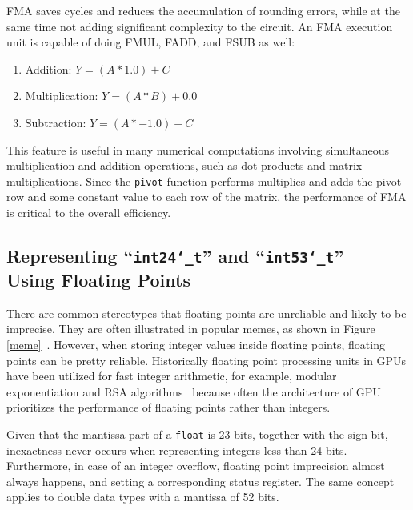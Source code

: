 \documentclass[logo,bsc,singlespacing,parskip]{infthesis}
\newcommand{\dtfloat}{\texttt{float}}
\newcommand{\dtfloati}{\texttt{int24\char`_t}}
\newcommand{\dtdoublei}{\texttt{int53\char`_t}}
\newcommand{\pivot}{\texttt{pivot}}
\newenvironment{compactlist}
{ \begin{enumerate}
    \setlength{\itemsep}{0pt}
    \setlength{\parskip}{0pt}
    \setlength{\parsep}{0pt}     
}
{ \end{enumerate} }
\begin{document}
FMA saves cycles and reduces the accumulation of rounding errors, while at the same time not adding significant complexity to the circuit. An FMA execution unit is capable of doing FMUL, FADD, and FSUB as well: 
\begin{compactlist} 
\item[] Addition: \begin{math}Y = (A * 1.0) + C \end{math} 
\item[] Multiplication: \begin{math} Y = (A * B) + 0.0 \end{math} 
\item[] Subtraction: \begin{math} Y = (A * -1.0) + C\end{math} 
\end{compactlist} 

This feature is useful in many numerical computations involving simultaneous multiplication and addition operations, such as dot products and matrix multiplications. Since the \pivot{} function performs multiplies and adds the pivot row and some constant value to each row of the matrix, the performance of FMA is critical to the overall efficiency. 

\subsection{Representing ``\dtfloati{}'' and ``\dtdoublei{}'' \\ Using Floating Points}
\label{sec:fpe2}

There are common stereotypes that floating points are unreliable and likely to be imprecise. They are often illustrated in popular memes, as shown in Figure \ref{meme}~\cite{meme}. However, when storing integer values inside floating points, floating points can be pretty reliable. Historically floating point processing units in GPUs have been utilized for fast integer arithmetic, for example, modular exponentiation and RSA algorithms~\cite{intfpu-modexp} because often the architecture of GPU prioritizes the performance of floating points rather than integers. 

Given that the mantissa part of a \dtfloat{} is 23 bits, together with the sign bit, inexactness never occurs when representing integers less than 24 bits. Furthermore, in case of an integer overflow, floating point imprecision almost always happens, and setting a corresponding status register. The same concept applies to double data types with a mantissa of 52 bits.
\end{document}
